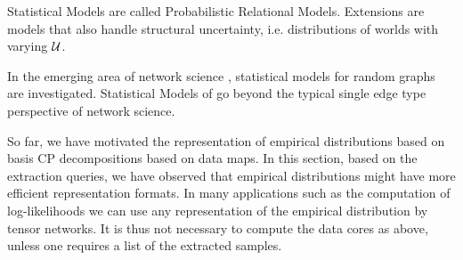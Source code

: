 




Statistical Models are called Probabilistic Relational Models. %
Extensions are models that also handle structural uncertainty, i.e. distributions of worlds with varying $\mathcal{U}$.

In the emerging area of network science \cite{barabasi_network_2016, giovanni_russo_vito_latora_complex_2017}, statistical models for random graphs are investigated.
Statistical Models of \firstOrderLogic{} go beyond the typical single edge type perspective of network science.


%
\begin{remark}
    So far, we have motivated the representation of empirical distributions based on basis CP decompositions based on data maps.
    In this section, based on the extraction queries, we have observed that empirical distributions might have more efficient representation formats.
    In many applications such as the computation of log-likelihoods we can use any representation of the empirical distribution by tensor networks.
    It is thus not necessary to compute the data cores as above, unless one requires a list of the extracted samples.
\end{remark}